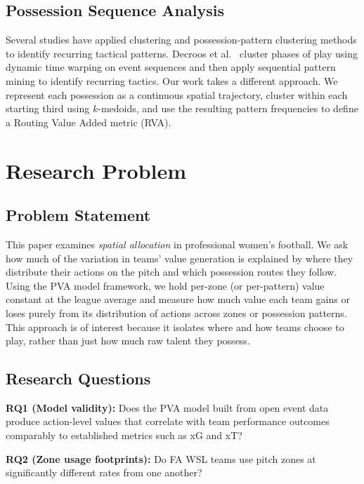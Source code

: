 \documentclass[12pt,a4paper]{article}
\begin{document}
\subsection{Possession Sequence Analysis}
Several studies have applied clustering and possession-pattern clustering methods to identify recurring tactical patterns. Decroos et al.\ \cite{decroos2018automatic} cluster phases of play using dynamic time warping on event sequences and then apply sequential pattern mining to identify recurring tactics. Our work takes a different approach. We represent each possession as a continuous spatial trajectory, cluster within each starting third using $k$-medoids, and use the resulting pattern frequencies to define a Routing Value Added metric (RVA).


\section{Research Problem}

\subsection{Problem Statement}
This paper examines \emph{spatial allocation} in professional women’s football. We ask how much of the variation in teams’ value generation is explained by where they distribute their actions on the pitch and which possession routes they follow. Using the PVA model framework, we hold per-zone (or per-pattern) value constant at the league average and measure how much value each team gains or loses purely from its distribution of actions across zones or possession patterns. This approach is of interest because it isolates where and how teams choose to play, rather than just how much raw talent they possess.

\subsection{Research Questions}

\textbf{RQ1 (Model validity):} Does the PVA model built from open event data produce action-level values that correlate with team performance outcomes comparably to established metrics such as xG and xT?

\textbf{RQ2 (Zone usage footprints):} Do FA WSL teams use pitch zones at significantly different rates from one another?
\end{document}
